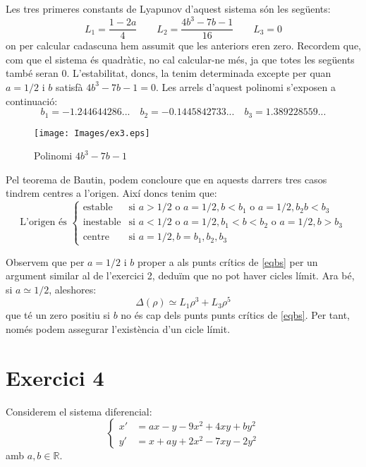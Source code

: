 \documentclass[a4paper]{article}
\newcommand{\RR}{\ensuremath{\mathbb{R}}} %
\theoremstyle{definition}
\begin{document}
Les tres primeres constants de Lyapunov d'aquest sistema són les següents:
$$L_1=\frac{1-2a}{4}\qquad L_2=\frac{4b^3-7b-1}{16}\qquad L_3 = 0$$
on per calcular cadascuna hem assumit que les anteriors eren zero. Recordem que, com que el sistema és quadràtic, no cal calcular-ne més, ja que totes les següents també seran 0. L'estabilitat, doncs, la tenim determinada excepte per quan $a=1/2$ i $b$ satisfà $4b^3-7b-1=0$. Les arrels d'aquest polinomi s'exposen a continuació:
\begin{equation}\label{eqbs}
  b_1=-1.244644286...\quad b_2=-0.1445842733...\quad b_3=1.389228559...
\end{equation}

\begin{figure}[ht]
  \centering
  \texttt{[image: Images/ex3.eps]}
  \caption{Polinomi $4b^3-7b-1$}
\end{figure}

Pel teorema de Bautin, podem concloure que en aquests darrers tres casos tindrem centres a l'origen. Així doncs tenim que:
$$\text{L'origen és }
  \begin{cases}
    \text{estable}   & \text{si } a > 1/2 \text{ o } a = 1/2, b<b_1 \text{ o }  a = 1/2, b_2b<b_3  \\
    \text{inestable} & \text{si } a < 1/2 \text{ o } a = 1/2, b_1<b<b_2 \text{ o }  a = 1/2, b>b_3 \\
    \text{centre}    & \text{si } a = 1/2, b=b_1, b_2, b_3
  \end{cases}
$$

Observem que per $a=1/2$ i $b$ proper a als punts crítics de \eqref{eqbs} per un argument similar al de l'exercici 2, deduïm que no pot haver cicles límit. Ara bé, si $a\simeq 1/2$, aleshores: $$\Delta(\rho)\simeq L_1\rho^3+L_3\rho^5$$
que té un zero positiu si $b$ no és cap dels punts punts crítics de \eqref{eqbs}. Per tant, només podem assegurar l'existència d'un cicle límit.

\newpage
\section*{Exercici 4}
Considerem el sistema diferencial:
\begin{equation}\label{sis4}
  \left\{
  \begin{aligned}
    x' & =ax-y-9x^2+4xy+by^2   \\
    y' & =x +ay+2x^2-7xy -2y^2
  \end{aligned}
  \right.
\end{equation}
amb $a,b\in\RR$.
\end{document}
